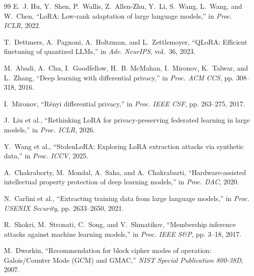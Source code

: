 \documentclass[10pt,conference,compsocconf]{IEEEtran}
\begin{document}
\begin{thebibliography}{99}
E.~J. Hu, Y.~Shen, P.~Wallis, Z.~Allen-Zhu, Y.~Li, S.~Wang, L.~Wang, and W.~Chen, ``LoRA: Low-rank adaptation of large language models,'' in \emph{Proc. ICLR}, 2022.

T.~Dettmers, A.~Pagnoni, A.~Holtzman, and L.~Zettlemoyer, ``QLoRA: Efficient finetuning of quantized LLMs,'' in \emph{Adv. NeurIPS}, vol.~36, 2023.

M.~Abadi, A.~Chu, I.~Goodfellow, H.~B. McMahan, I.~Mironov, K.~Talwar, and L.~Zhang, ``Deep learning with differential privacy,'' in \emph{Proc. ACM CCS}, pp. 308--318, 2016.

I.~Mironov, ``R\'enyi differential privacy,'' in \emph{Proc. IEEE CSF}, pp. 263--275, 2017.

J.~Liu et al., ``Rethinking LoRA for privacy-preserving federated learning in large models,'' in \emph{Proc. ICLR}, 2026.

Y.~Wang et al., ``StolenLoRA: Exploring LoRA extraction attacks via synthetic data,'' in \emph{Proc. ICCV}, 2025.

A.~Chakraborty, M.~Mondal, A.~Saha, and A.~Chakrabarti, ``Hardware-assisted intellectual property protection of deep learning models,'' in \emph{Proc. DAC}, 2020.

N.~Carlini et al., ``Extracting training data from large language models,'' in \emph{Proc. USENIX Security}, pp. 2633--2650, 2021.

R.~Shokri, M.~Stronati, C.~Song, and V.~Shmatikov, ``Membership inference attacks against machine learning models,'' in \emph{Proc. IEEE S\&P}, pp. 3--18, 2017.

M.~Dworkin, ``Recommendation for block cipher modes of operation: Galois/Counter Mode (GCM) and GMAC,'' \emph{NIST Special Publication 800-38D}, 2007.

\end{thebibliography}
\end{document}
